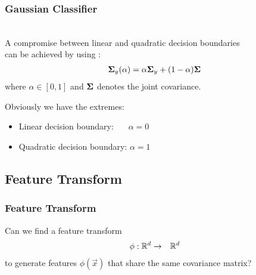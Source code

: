 \begin{frame}
  \frametitle{Gaussian Classifier \cont}
  
   \\[.5cm]
  
  A compromise between linear and quadratic decision boundaries \\
  can be achieved by using :
%  
  \begin{eqnarray*}
    {\bm \Sigma}_y (\alpha)= \alpha {\bm \Sigma}_y + (1-\alpha){\bm \Sigma}
  \end{eqnarray*}
%  
  where $\alpha\in [0,1]$ and ${\bm \Sigma}$ denotes the joint covariance.
  \spread
  
  Obviously we have the extremes:
  \begin{itemize}
    \item Linear decision boundary: $\quad ~~\alpha = 0$
    \item Quadratic decision boundary: $\alpha =1$
  \end{itemize}
\end{frame}


\subsection{Feature Transform}

\begin{frame}
  \frametitle{Feature Transform}

  Can we find a feature transform
%  
  \begin{eqnarray*}
    \phi: \mathbb{R}^d &\rightarrow &\mathbb{R}^d
   \end{eqnarray*}
%
  to generate features $\phi(\vec x)$ that share the same covariance matrix?
\end{frame}


